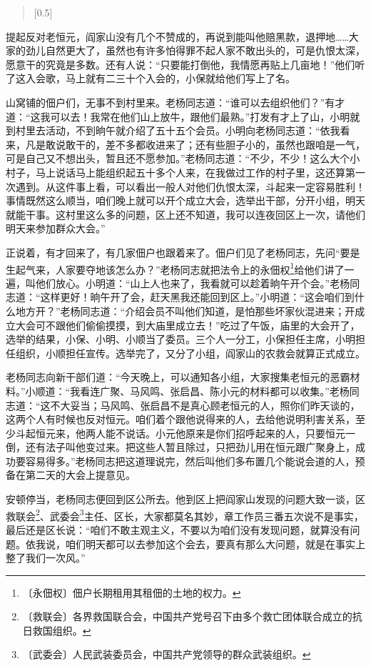 \documentclass[12pt,UTF-8,openany]{ctexbook}
\begin{document}
\begin{normalsize}
\begin{verse}[0.5\linewidth]
    \end{verse}
    
    提起反对老恒元，阎家山没有几个不赞成的，再说到能叫他赔黑款，退押地……大家的劲儿自然更大了，虽然也有许多怕得罪不起人家不敢出头的，可是仇恨太深，愿意干的究竟是多数。还有人说：“只要能打倒他，我情愿再贴上几亩地！”他们听了这入会歌，马上就有二三十个入会的，小保就给他们写上了名。
    
    山窝铺的佃户们，无事不到村里来。老杨同志道：“谁可以去组织他们？”有才道：“这我可以去！我常在他们山上放牛，跟他们最熟。”打发有才上了山，小明就到村里去活动，不到晌午就介绍了五十五个会员。小明向老杨同志道：“依我看来，凡是敢说敢干的，差不多都收进来了；还有些胆子小的，虽然也跟咱是一气，可是自己又不想出头，暂且还不愿参加。”老杨同志道：“不少，不少！这么大个小村子，马上说话马上能组织起五十多个人来，在我做过工作的村子里，这还算第一次遇到。从这件事上看，可以看出一般人对他们仇恨太深，斗起来一定容易胜利！事情既然这么顺当，咱们晚上就可以开个成立大会，选举出干部，分开小组，明天就能干事。这村里这么多的问题，区上还不知道，我可以连夜回区上一次，请他们明天来参加群众大会。”
    
    正说着，有才回来了，有几家佃户也跟着来了。佃户们见了老杨同志，先问“要是生起气来，人家要夺地该怎么办？”老杨同志就把法令上的永佃权\footnote{〔永佃权〕佃户长期租用其租佃的土地的权力。}给他们讲了一遍，叫他们放心。小明道：“山上人也来了，我看就可以趁着晌午开个会。”老杨同志道：“这样更好！晌午开了会，赶天黑我还能回到区上。”小明道：“这会咱们到什么地方开？”老杨同志道：“介绍会员不叫他们知道，是怕那些坏家伙混进来；开成立大会可不跟他们偷偷摸摸，到大庙里成立去！”吃过了午饭，庙里的大会开了，选举的结果，小保、小明、小顺当了委员。三个人一分工，小保担任主席，小明担任组织，小顺担任宣传。选举完了，又分了小组，阎家山的农救会就算正式成立。
    
    老杨同志向新干部们道：“今天晚上，可以通知各小组，大家搜集老恒元的恶霸材料。”小顺道：“我看连广聚、马风鸣、张启昌、陈小元的材料都可以收集。”老杨同志道：“这不大妥当；马风鸣、张启昌不是真心顾老恒元的人，照你们昨天谈的，这两个人有时候也反对恒元。咱们着个跟他说得来的人，去给他说明利害关系，至少斗起恒元来，他两人能不说话。小元他原来是你们招呼起来的人，只要恒元一倒，还有法子叫他变过来。把这些人暂且除过，只把劲儿用在恒元跟广聚身上，成功要容易得多。”老杨同志把这道理说完，然后叫他们多布置几个能说会道的人，预备在第二天的大会上提意见。
    
    安顿停当，老杨同志便回到区公所去。他到区上把阎家山发现的问题大致一谈，区救联会\footnote{〔救联会〕各界救国联合会，中国共产党号召下由多个救亡团体联合成立的抗日救国组织。}、武委会\footnote{〔武委会〕人民武装委员会，中国共产党领导的群众武装组织。}主任、区长，大家都莫名其妙，章工作员三番五次说不是事实，最后还是区长说：“咱们不敢主观主义，不要以为咱们没有发现问题，就算没有问题。依我说，咱们明天都可以去参加这个会去，要真有那么大问题，就是在事实上整了我们一次风。”
    

\end{normalsize}
\end{document}
